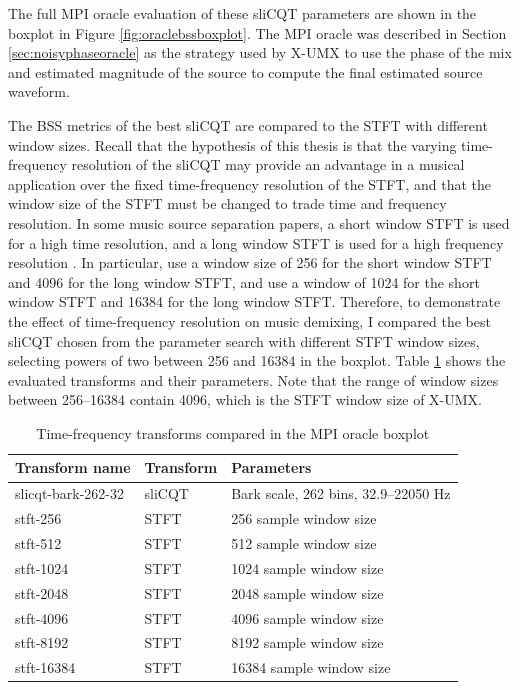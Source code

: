\documentclass[report.tex]{subfiles}
\begin{document}
The full MPI oracle evaluation of these sliCQT parameters are shown in the boxplot in Figure \ref{fig:oraclebssboxplot}. The MPI oracle was described in Section \ref{sec:noisyphaseoracle} as the strategy used by X-UMX to use the phase of the mix and estimated magnitude of the source to compute the final estimated source waveform.

The BSS metrics of the best sliCQT are compared to the STFT with different window sizes. Recall that the hypothesis of this thesis is that the varying time-frequency resolution of the sliCQT may provide an advantage in a musical application over the fixed time-frequency resolution of the STFT, and that the window size of the STFT must be changed to trade time and frequency resolution. In some music source separation papers, a short window STFT is used for a high time resolution, and a long window STFT is used for a high frequency resolution \parencite{fitzgerald2, driedger}. In particular, \textcite{driedger} use a window size of 256 for the short window STFT and 4096 for the long window STFT, and \textcite{fitzgerald2} use a window of 1024 for the short window STFT and 16384 for the long window STFT. Therefore, to demonstrate the effect of time-frequency resolution on music demixing, I compared the best sliCQT chosen from the parameter search with different STFT window sizes, selecting powers of two between 256 and 16384 in the boxplot. Table \ref{table:winsizes} shows the evaluated transforms and their parameters. Note that the range of window sizes between 256--16384 contain 4096, which is the STFT window size of X-UMX.

\begin{table}[ht]
	\centering
	\caption{Time-frequency transforms compared in the MPI oracle boxplot}
	\label{table:winsizes}
	\begin{tabular}{ |l|l|l| }
	 \hline
		Transform name & Transform & Parameters \\
	 \hline
	 \hline
		slicqt-bark-262-32 & sliCQT & Bark scale, 262 bins, 32.9--22050 Hz \\
	 \hline
		stft-256 & STFT & 256 sample window size \\
	 \hline
		stft-512 & STFT & 512 sample window size \\
	 \hline
		stft-1024 & STFT & 1024 sample window size \\
	 \hline
		stft-2048 & STFT & 2048 sample window size \\
	 \hline
		stft-4096 & STFT & 4096 sample window size \\
	 \hline
		stft-8192 & STFT & 8192 sample window size \\
	 \hline
		stft-16384 & STFT & 16384 sample window size \\
	 \hline
\end{tabular}
\end{table}
\end{document}
